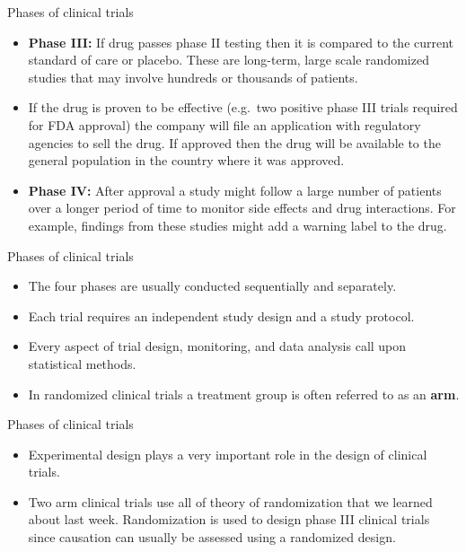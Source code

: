 \documentclass[ignorenonframetext,]{beamer}
\begin{document}
\begin{frame}{Phases of clinical trials}

\begin{itemize}[<+->]
\item
  \textbf{Phase III:} If drug passes phase II testing then it is
  compared to the current standard of care or placebo. These are
  long-term, large scale randomized studies that may involve hundreds or
  thousands of patients.
\item
  If the drug is proven to be effective (e.g.~two positive phase III
  trials required for FDA approval) the company will file an application
  with regulatory agencies to sell the drug. If approved then the drug
  will be available to the general population in the country where it
  was approved.
\item
  \textbf{Phase IV:} After approval a study might follow a large number
  of patients over a longer period of time to monitor side effects and
  drug interactions. For example, findings from these studies might add
  a warning label to the drug.
\end{itemize}

\end{frame}

\begin{frame}{Phases of clinical trials}

\begin{itemize}[<+->]
\itemsep1pt\parskip0pt
\item
  The four phases are usually conducted sequentially and separately.
\item
  Each trial requires an independent study design and a study protocol.
\item
  Every aspect of trial design, monitoring, and data analysis call upon
  statistical methods.
\item
  In randomized clinical trials a treatment group is often referred to
  as an \textbf{arm}.
\end{itemize}

\end{frame}

\begin{frame}{Phases of clinical trials}

\begin{itemize}[<+->]
\item
  Experimental design plays a very important role in the design of
  clinical trials.
\item
  Two arm clinical trials use all of theory of randomization that we
  learned about last week. Randomization is used to design phase III
  clinical trials since causation can usually be assessed using a
  randomized design.
\end{itemize}

\end{frame}
\end{document}
